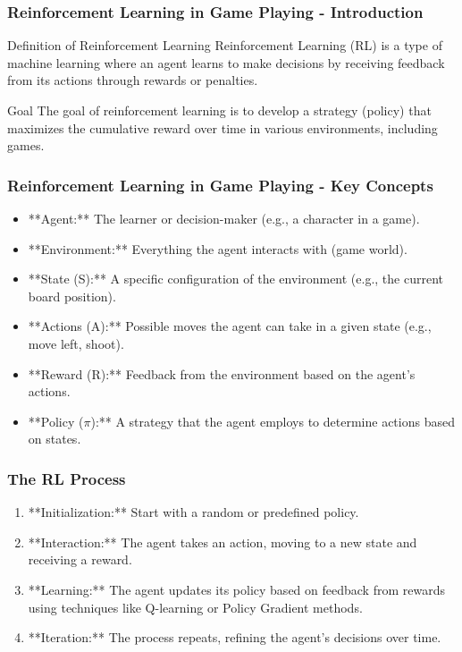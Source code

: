 \documentclass[aspectratio=169]{beamer}
\begin{document}
\begin{frame}[fragile]
    \frametitle{Reinforcement Learning in Game Playing - Introduction}
    \begin{block}{Definition of Reinforcement Learning}
        Reinforcement Learning (RL) is a type of machine learning where an agent learns to make decisions by receiving feedback from its actions through rewards or penalties.
    \end{block}
    
    \begin{block}{Goal}
        The goal of reinforcement learning is to develop a strategy (policy) that maximizes the cumulative reward over time in various environments, including games.
    \end{block}
\end{frame}

\begin{frame}[fragile]
    \frametitle{Reinforcement Learning in Game Playing - Key Concepts}
    \begin{itemize}
        \item **Agent:** The learner or decision-maker (e.g., a character in a game).
        \item **Environment:** Everything the agent interacts with (game world).
        \item **State (S):** A specific configuration of the environment (e.g., the current board position).
        \item **Actions (A):** Possible moves the agent can take in a given state (e.g., move left, shoot).
        \item **Reward (R):** Feedback from the environment based on the agent's actions.
        \item **Policy ($\pi$):** A strategy that the agent employs to determine actions based on states.
    \end{itemize}
\end{frame}

\begin{frame}[fragile]
    \frametitle{The RL Process}
    \begin{enumerate}
        \item **Initialization:** Start with a random or predefined policy.
        \item **Interaction:** The agent takes an action, moving to a new state and receiving a reward.
        \item **Learning:** The agent updates its policy based on feedback from rewards using techniques like Q-learning or Policy Gradient methods.
        \item **Iteration:** The process repeats, refining the agent's decisions over time.
    \end{enumerate}
\end{frame}
\end{document}
